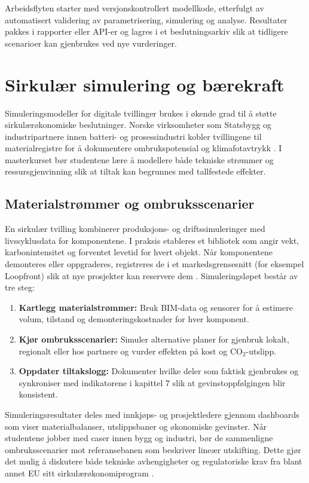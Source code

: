 Arbeidsflyten starter med versjonskontrollert modellkode, etterfulgt av automatisert validering av parametrisering, simulering og analyse. Resultater pakkes i rapporter eller API-er og lagres i et beslutningsarkiv slik at tidligere scenarioer kan gjenbrukes ved nye vurderinger.

\section{Sirkulær simulering og bærekraft}
Simuleringsmodeller for digitale tvillinger brukes i økende grad til å støtte sirkulærøkonomiske beslutninger. Norske virksomheter som Statsbygg og industripartnere innen batteri- og prosessindustri kobler tvillingene til materialregistre for å dokumentere ombrukspotensial og klimafotavtrykk \citep{statsbygg2022ombruk,statsbygg2023loopfront}. I masterkurset bør studentene lære å modellere både tekniske strømmer og ressursgjenvinning slik at tiltak kan begrunnes med tallfestede effekter.

\subsection{Materialstrømmer og ombruksscenarier}
En sirkulær tvilling kombinerer produksjons- og driftssimuleringer med livssyklusdata for komponentene. I praksis etableres et bibliotek som angir vekt, karbonintensitet og forventet levetid for hvert objekt. Når komponentene demonteres eller oppgraderes, registreres de i et markedsgrensesnitt (for eksempel Loopfront) slik at nye prosjekter kan reservere dem \citep{statsbygg2023loopfront}. Simuleringsløpet består av tre steg:
\begin{enumerate}
    \item \textbf{Kartlegg materialstrømmer:} Bruk BIM-data og sensorer for å estimere volum, tilstand og demonteringskostnader for hver komponent.
    \item \textbf{Kjør ombruksscenarier:} Simuler alternative planer for gjenbruk lokalt, regionalt eller hos partnere og vurder effekten på kost og CO$_2$-utslipp.
    \item \textbf{Oppdater tiltakslogg:} Dokumenter hvilke deler som faktisk gjenbrukes og synkroniser med indikatorene i kapittel 7 slik at gevinstoppfølgingen blir konsistent.
\end{enumerate}

Simuleringsresultater deles med innkjøps- og prosjektledere gjennom dashboards som viser materialbalanser, utslippsbaner og økonomiske gevinster. Når studentene jobber med caser innen bygg og industri, bør de sammenligne ombruksscenarier mot referansebanen som beskriver lineær utskifting. Dette gjør det mulig å diskutere både tekniske avhengigheter og regulatoriske krav fra blant annet EU sitt sirkulærøkonomiprogram \citep{miljodir2022sirkular,regjeringen2021sirkulaer}.

